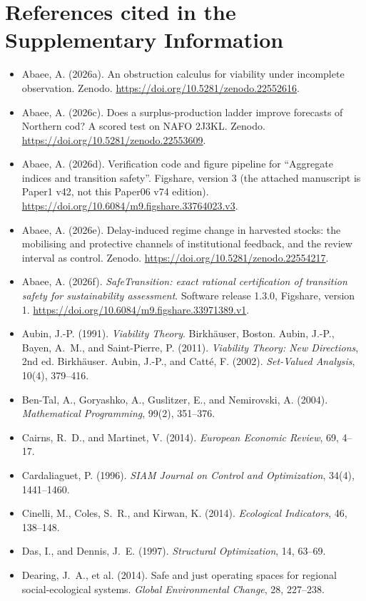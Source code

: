 \documentclass[preprint,11pt,authoryear]{elsarticle}
\theoremstyle{remark}
\begin{document}
\section*{References cited in the Supplementary Information}
\begin{itemize}[leftmargin=1.5em,itemsep=1pt]
\item Abaee, A. (2026a). An obstruction calculus for viability under incomplete observation. Zenodo. \url{https://doi.org/10.5281/zenodo.22552616}.
\item Abaee, A. (2026c). Does a surplus-production ladder improve forecasts of Northern cod? A scored test on NAFO 2J3KL. Zenodo. \url{https://doi.org/10.5281/zenodo.22553609}.
\item Abaee, A. (2026d). Verification code and figure pipeline for ``Aggregate indices and transition safety''. Figshare, version 3 (the attached manuscript is Paper1 v42, not this Paper06 v74 edition). \url{https://doi.org/10.6084/m9.figshare.33764023.v3}.
\item Abaee, A. (2026e). Delay-induced regime change in harvested stocks: the mobilising and protective channels of institutional feedback, and the review interval as control. Zenodo. \url{https://doi.org/10.5281/zenodo.22554217}.
\item Abaee, A. (2026f). \emph{SafeTransition: exact rational certification of transition safety for sustainability assessment}. Software release 1.3.0, Figshare, version 1. \url{https://doi.org/10.6084/m9.figshare.33971389.v1}.
\item Aubin, J.-P. (1991). \emph{Viability Theory}. Birkh\"auser, Boston. Aubin, J.-P., Bayen, A.~M., and Saint-Pierre, P. (2011). \emph{Viability Theory: New Directions}, 2nd ed. Birkh\"auser. Aubin, J.-P., and Catt\'e, F. (2002). \emph{Set-Valued Analysis}, 10(4), 379--416.
\item Ben-Tal, A., Goryashko, A., Guslitzer, E., and Nemirovski, A. (2004). \emph{Mathematical Programming}, 99(2), 351--376.
\item Cairns, R.~D., and Martinet, V. (2014). \emph{European Economic Review}, 69, 4--17.
\item Cardaliaguet, P. (1996). \emph{SIAM Journal on Control and Optimization}, 34(4), 1441--1460.
\item Cinelli, M., Coles, S.~R., and Kirwan, K. (2014). \emph{Ecological Indicators}, 46, 138--148.
\item Das, I., and Dennis, J.~E. (1997). \emph{Structural Optimization}, 14, 63--69.
\item Dearing, J.~A., et al. (2014). Safe and just operating spaces for regional social-ecological systems. \emph{Global Environmental Change}, 28, 227--238.

\end{itemize}
\end{document}
